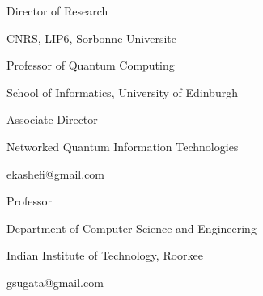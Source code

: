 
\begin{minipage}[t]{.5\linewidth}
  \raggedright
  \begin{description}
    \item[Dr. Elham Kashefi]
    \item{Director of Research}
    \item{\hspace{8pt}CNRS, LIP6, Sorbonne Universite}
    \item{Professor of Quantum Computing}
    \item{\hspace{8pt}School of Informatics, University of Edinburgh}
    \item{Associate Director}
    \item{\hspace{8pt}Networked Quantum Information Technologies}
    \item{ekashefi@gmail.com}
  \end{description}
\end{minipage}%
\hfil
\begin{minipage}[t]{.5\linewidth}
  \raggedright
  \begin{description}
    \item[Dr. Sugata Gangopadhyay]
    \item{Professor}
    \item{Department of Computer Science and Engineering}
    \item{Indian Institute of Technology, Roorkee}
    \item{gsugata@gmail.com}
  \end{description}
\end{minipage}%
\hfil